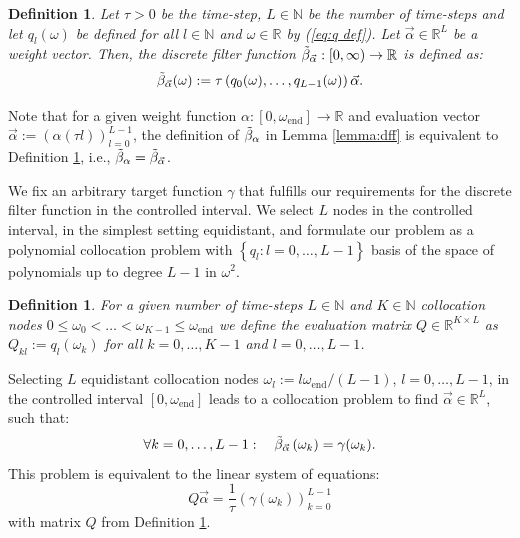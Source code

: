 \documentclass[a4paper,11pt,bibliography=totoc,listof=totoc,headinclude=true,cleardoublepage=empty,oneside]{scrbook}
\newtheorem{definition}[theorem]{Definition}
\newcommand{\R}{\mathbb{R}}
\newcommand{\N}{\mathbb{N}}
\newcommand{\dff}{\Tilde{\beta}_\alpha}
\newcommand{\dffv}{\Tilde{\beta}_{\Vec{\alpha}}}
\newcommand{\e}{\mathrm{end}}
\renewcommand{\eqref}[1]{(\ref{#1})}
\begin{document}
\begin{definition}\label{def:dffv}
    Let $\tau > 0$ be the time-step, $L\in \N$ be the number of time-steps and let $q_l(\omega)$ be defined for all $l \in \N$ and $\omega \in \R$ by \eqref{eq:q def}. Let $\Vec{\alpha}\in\R^L$ be a weight vector. Then, the discrete filter function $\dffv: [0, \infty) \rightarrow \R$ is defined as:
    \begin{equation}\label{eq:dffv}
        \dffv (\omega) := \tau \left(q_0(\omega), \dots, q_{L-1}(\omega)\right) \Vec{\alpha}. 
    \end{equation}
\end{definition}

Note that for a given weight function $\alpha: \left[0, \omega_\e\right] \rightarrow \R$ and evaluation vector $\Vec{\alpha} := \left(\alpha(\tau l)\right)_{l=0}^{L-1}$, the definition of $\dff$ in Lemma \ref{lemma:dff} is equivalent to Definition \ref{def:dffv}, i.e., $\dff = \dffv$.

We fix an arbitrary target function $\gamma$ that fulfills our requirements for the discrete filter function in the controlled interval. We select $L$ nodes in the controlled interval, in the simplest setting equidistant, and formulate our problem as a polynomial collocation problem with $\left\{q_l : l=0, \dots, L-1\right\}$ basis of the space of polynomials up to degree $L-1$ in $\omega^2$.
\begin{definition}\label{def:evaluation matrix}
    For a given number of time-steps $L\in \N$ and $K\in \N$ collocation nodes $ 0 \leqslant \omega_0 < \dots < \omega_{K-1} \leqslant \omega_\e$ we define the evaluation matrix $Q \in \R^{K\times L}$ as $Q_{kl} := q_l\left(\omega_k\right)$ for all $k=0, \dots, K-1$ and $l=0, \dots, L-1$. 
\end{definition}

Selecting $L$ equidistant collocation nodes $\omega_l := l\omega_\e/ (L-1)$, $l=0, \dots, L-1$, in the controlled interval $\left[0, \omega_{\e}\right]$ leads to  a collocation problem to find $\Vec{\alpha} \in \R^L$, such that:
\begin{equation*}
    \forall k = 0, \dots, L-1: \quad \dffv\left(\omega_k\right) = \gamma(\omega_k).
\end{equation*}
This problem is equivalent to the linear system of equations:
\begin{equation}\label{eq:alpha eq coll}
     Q \Vec{\alpha} = \frac{1}{\tau} \left(\gamma(\omega_k) \right)_{k=0}^{L-1}
\end{equation}
with matrix $Q$ from Definition \ref{def:evaluation matrix}.
\end{document}
